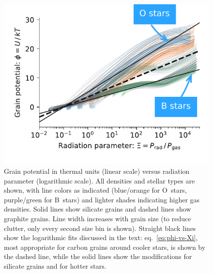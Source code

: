 \begin{figure}
  \centering
  \includegraphics[width=\linewidth]{figs/phi-versus-xi-annotate}
  \caption{Grain potential in thermal units (linear scale) versus
    radiation parameter (logarithmic scale). All densities and stellar
    types are shown, with line colors as indicated (blue/orange for
    O~stars, purple/green for B~stars) and lighter shades indicating
    higher gas densities.  Solid lines show silicate grains and dashed
    lines show graphite grains.  Line width increases with grain size
    (to reduce clutter, only every second size bin is shown).
    Straight black lines show the logarithmic fits discussed in the
    text: eq.~\eqref{eq:phi-vs-Xi}, most appropriate for carbon grains
    around cooler stars, is shown by the dashed line, while the solid
    lines show the modifications for silicate grains and for hotter
    stars.}
  \label{fig:phi-vs-Xi}
\end{figure}

